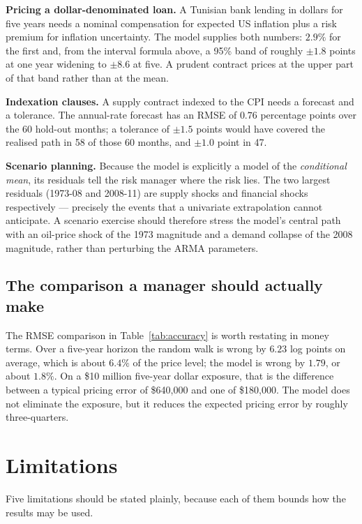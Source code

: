 \textbf{Pricing a dollar-denominated loan.} A Tunisian bank lending in dollars for
five years needs a nominal compensation for expected US inflation plus a risk
premium for inflation uncertainty. The model supplies both numbers: $2.9\%$ for the
first and, from the interval formula above, a 95\% band of roughly
$\pm1.8$ points at one year widening to $\pm8.6$ at five. A prudent contract prices
at the upper part of that band rather than at the mean.

\textbf{Indexation clauses.} A supply contract indexed to the CPI needs a forecast
and a tolerance. The annual-rate forecast has an RMSE of $0.76$ percentage points
over the 60 hold-out months; a tolerance of $\pm1.5$ points would have covered the
realised path in 58 of those 60 months, and $\pm1.0$ point in 47.

\textbf{Scenario planning.} Because the model is explicitly a model of the
\emph{conditional mean}, its residuals tell the risk manager where the risk lies.
The two largest residuals (1973-08 and 2008-11) are supply shocks and financial
shocks respectively --- precisely the events that a univariate extrapolation cannot
anticipate. A scenario exercise should therefore stress the model's central path
with an oil-price shock of the 1973 magnitude and a demand collapse of the 2008
magnitude, rather than perturbing the ARMA parameters.

\subsection{The comparison a manager should actually make}

The RMSE comparison in Table~\ref{tab:accuracy} is worth restating in money terms.
Over a five-year horizon the random walk is wrong by $6.23$ log points on average,
which is about $6.4\%$ of the price level; the model is wrong by $1.79$, or about
$1.8\%$. On a \$10 million five-year dollar exposure, that is the difference between
a typical pricing error of \$640,000 and one of \$180,000. The model does not
eliminate the exposure, but it reduces the expected pricing error by roughly
three-quarters.

\section{Limitations}
\label{sec:limits}

Five limitations should be stated plainly, because each of them bounds how the
results may be used.

